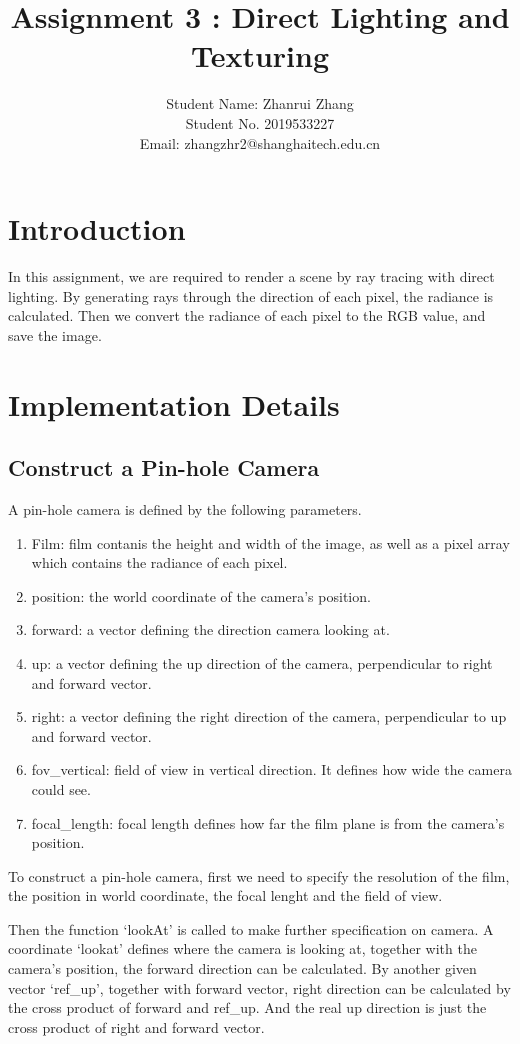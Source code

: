 \documentclass[acmtog]{acmart}
\title{Assignment 3 : Direct Lighting and Texturing}
\author{Student Name: Zhanrui Zhang\\
        Student No. 2019533227\\
        Email: zhangzhr2@shanghaitech.edu.cn
}
\begin{document}
\maketitle

\vspace*{2 ex}


\section{Introduction}

In this assignment, we are required to render a scene by ray tracing with direct lighting. By generating rays through the direction of each pixel, the radiance is calculated. Then we convert the radiance of each pixel to the RGB value, and save the image.

\section{Implementation Details}
\subsection{Construct a Pin-hole Camera}
A pin-hole camera is defined by the following parameters.
\begin{enumerate}
    \item Film: film contanis the height and width of the image, as well as a pixel array which contains the radiance of each pixel.
    \item position: the world coordinate of the camera's position.
    \item forward: a vector defining the direction camera looking at.
    \item up: a vector defining the up direction of the camera, perpendicular to right and forward vector.
    \item right: a vector defining the right direction of the camera, perpendicular to up and forward vector.
    \item fov\_vertical: field of view in vertical direction. It defines how wide the camera could see.
    \item focal\_length: focal length defines how far the film plane is from the camera's position.
\end{enumerate}
To construct a pin-hole camera, first we need to specify the resolution of the film, the position in world coordinate, the focal lenght and the field of view.

Then the function `lookAt' is called to make further specification on camera. A coordinate `lookat' defines where the camera is looking at, together with the camera's position, the forward direction can be calculated. By another given vector `ref\_up', together with forward vector, right direction can be calculated by the cross product of forward and ref\_up. And the real up direction is just the cross product of right and forward vector.
\end{document}
